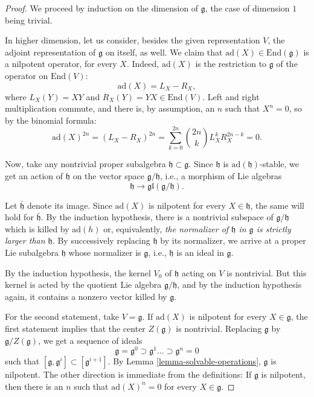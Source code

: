 \begin{proof}
 
We proceed by induction on the dimension of $\mathfrak g$, the case of dimension $1$ being trivial.
 
In higher dimension, let us consider, besides the given representation $V$, the adjoint representation of $\mathfrak g$ on itself, as well. We claim that $\text{ad}(X) \in \text{End}(\mathfrak g)$ is a nilpotent operator, for every $X$. Indeed, $\text{ad}(X)$ is the restriction to $\mathfrak g$ of the operator on $\text{End}(V)$: 
$$ \text{ad}(X) = L_X - R_X,$$
where $L_X(Y) = XY$ and $R_X(Y) = YX \in \text{End}(V)$. Left and right multiplication commute, and there is, by assumption, an $n$ such that $X^n=0$, so by the binomial formula:
$$\text{ad}(X)^{2n} = (L_X - R_X)^{2n} = \sum_{k=0}^{2n} \binom{2n}{k} L_X^k R_X^{2n-k} = 0.$$

Now, take any nontrivial proper subalgebra $\mathfrak h \subset \mathfrak g$. Since $\mathfrak h$ is $\text{ad}(\mathfrak h)$-stable, we get an action of $\mathfrak h$ on the vector space $\mathfrak g/\mathfrak h$, i.e., a morphism of Lie algebras
 $$ \mathfrak h \to \mathfrak{gl}(\mathfrak g/\mathfrak h).$$
 
Let $\bar{\mathfrak h}$ denote its image. Since $\text{ad}(X)$ is nilpotent for every $X\in \mathfrak h$, the same will hold for $\bar{\mathfrak h}$. By the induction hypothesis, there is a nontrivial subspace of $\mathfrak g/\mathfrak h$ which is killed by $\text{ad}(h)$ or, equivalently, \emph{the normalizer of $\mathfrak h$ in $\mathfrak g$ is strictly larger than $\mathfrak h$}. By successively replacing $\mathfrak h$ by its normalizer, we arrive at a proper Lie subalgebra $\mathfrak h$ whose normalizer is $\mathfrak g$, i.e., $\mathfrak h$ is an ideal in $\mathfrak g$.

By the induction hypothesis, the kernel $V_0$ of $\mathfrak h$ acting on $V$ is nontrivial. But this kernel is acted by the quotient Lie algebra $\mathfrak g/\mathfrak h$, and by the induction hypothesis again, it contains a nonzero vector killed by $\mathfrak g$. 

 


For the second statement, take $V=\mathfrak g$. If $\text{ad}(X)$ is nilpotent for every $X \in \mathfrak g$, the first statement implies that the center $Z(\mathfrak g)$ is nontrivial. Replacing $\mathfrak g$ by $\mathfrak g/Z(\mathfrak g)$, we get a sequence of ideals 
$$ \mathfrak g = \mathfrak g^0 \supset \mathfrak g^1 \dots \supset \mathfrak g^n=0$$
such that $[\mathfrak g, \mathfrak g^i]\subset [\mathfrak g^{i+1}]$. By Lemma \ref{lemma-solvable-operations}, $\mathfrak g$ is nilpotent. The other direction is immediate from the definitions: If $\mathfrak g$ is nilpotent, then there is an $n$ such that $\text{ad}(X)^n = 0$ for every $X\in \mathfrak g$.
 
\end{proof}

